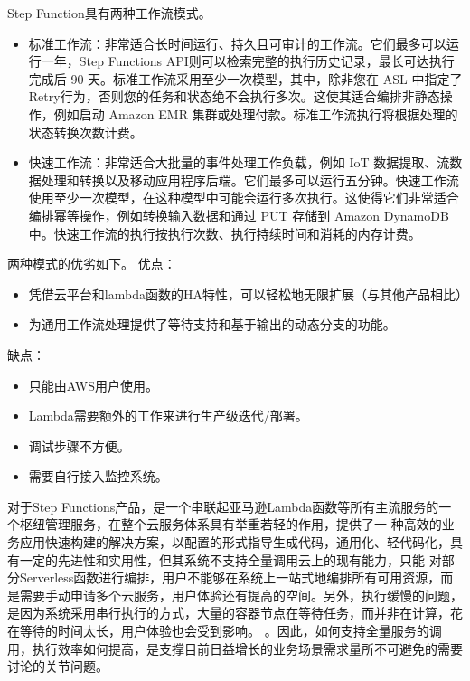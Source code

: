 Step Function具有两种工作流模式。
\begin{itemize}
    \item 标准工作流：非常适合长时间运行、持久且可审计的工作流。它们最多可以运行一年，Step Functions API则可以检索完整的执行历史记录，最长可达执行完成后 90 天。标准工作流采用至少一次模型，其中，除非您在 ASL 中指定了Retry行为，否则您的任务和状态绝不会执行多次。这使其适合编排非静态操作，例如启动 Amazon EMR 集群或处理付款。标准工作流执行将根据处理的状态转换次数计费。
    \item 快速工作流：非常适合大批量的事件处理工作负载，例如 IoT 数据提取、流数据处理和转换以及移动应用程序后端。它们最多可以运行五分钟。快速工作流使用至少一次模型，在这种模型中可能会运行多次执行。这使得它们非常适合编排幂等操作，例如转换输入数据和通过 PUT 存储到 Amazon DynamoDB 中。快速工作流的执行按执行次数、执行持续时间和消耗的内存计费。
\end{itemize}

两种模式的优劣如下。
优点：

\begin{itemize}
    \item 凭借云平台和lambda函数的HA特性，可以轻松地无限扩展（与其他产品相比）
    \item 为通用工作流处理提供了等待支持和基于输出的动态分支的功能。
\end{itemize}

缺点：

\begin{itemize}
    \item 只能由AWS用户使用。
    \item Lambda需要额外的工作来进行生产级迭代/部署。
    \item 调试步骤不方便。
    \item 需要自行接入监控系统。
\end{itemize}


对于Step Functions产品，是一个串联起亚马逊Lambda函数等所有主流服务的一个枢纽管理服务，在整个云服务体系具有举重若轻的作用，提供了一
种高效的业务应用快速构建的解决方案，以配置的形式指导生成代码，通用化、轻代码化，具有一定的先进性和实用性，但其系统不支持全量调用云上的现有能力，只能
对部分Serverless函数进行编排，用户不能够在系统上一站式地编排所有可用资源，而是需要手动申请多个云服务，用户体验还有提高的空间。另外，执行缓慢的问题，
是因为系统采用串行执行的方式，大量的容器节点在等待任务，而并非在计算，花在等待的时间太长，用户体验也会受到影响。
\cite{jybpmsyc}。因此，如何支持全量服务的调用，执行效率如何提高，是支撑目前日益增长的业务场景需求量所不可避免的需要讨论的关节问题。


